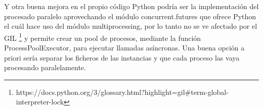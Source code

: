Y otra buena mejora en el propio código Python podría ser la implementación del procesado paralelo aprovechando el módulo concurrent.futures que ofrece Python el cuál hace uso del módulo multiprocessing, por lo tanto no se ve afectado por el \gls{GIL} \footnote{https://docs.python.org/3/glossary.html?highlight=gil\#term-global-interpreter-lock} y permite crear un pool de procesos, mediante la función ProcessPoolExecutor, para ejecutar llamadas asíncronas. Una buena opción a priori sería separar los ficheros de las instancias y que cada proceso las vaya procesando paralelamente.


